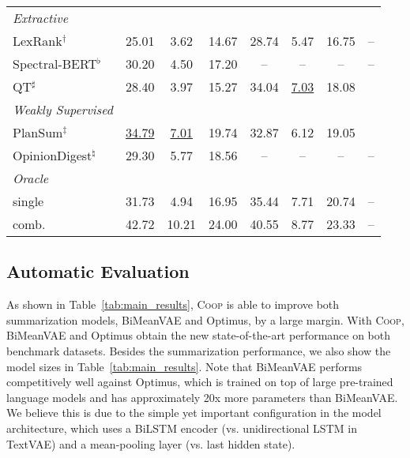 \documentclass[11pt]{article}
\newcommand{\aggname}{\textsc{Coop}}
\newcommand{\name}{\mbox{\sc BiMeanVAE}}
\begin{document}
\begin{table*}[t]
\begin{tabular}{lccccccc}
\textit{Extractive}\\
\quad LexRank$^\dagger$ & 25.01 & 3.62 & 14.67 & 28.74 & 5.47 & 16.75 & -- \\
\quad Spectral-BERT$^\flat$ & 30.20 & 4.50 & 17.20 & -- & -- & -- & --\\
\quad QT$^\sharp$ & 28.40 & 3.97 & 15.27 & 34.04 & \underline{7.03} & 18.08 \\
\midrule
\textit{Weakly Supervised}\\
\quad PlanSum$^\ddagger$ & \underline{34.79} & \underline{7.01} & 19.74 & 32.87 & 6.12 & 19.05\\
\quad OpinionDigest$^\natural$ & 29.30 & 5.77 & 18.56 & -- & -- & -- & -- \\
\midrule
\textit{Oracle}\\
\quad single & 31.73 & 4.94 & 16.95 & 35.44 & 7.71 & 20.74 & -- \\
\quad comb. & 42.72 & 10.21 & 24.00 & 40.55 & 8.77 & 23.33 & -- \\
\bottomrule
\end{tabular}
\caption{ROUGE scores on the benchmarks. Bold-faced and underlined denote the best and second-best scores respectively. \aggname{} significantly improves the performance of two summarization models, \name{} and Optimus, and achieves new state-of-the-art performance on both of the benchmark datasets.
$\dagger$ means the results
are copied from \citet{brazinskas-etal-2020-unsupervised}, $\ddagger$ from  \citet{amplayo2021unsupervised}, $\flat$ from 
\citet{wang-etal-2020-spectral}, $\sharp$ from \citet{angelidis2021extractive}, and $\natural$ from \citet{suhara-etal-2020-opiniondigest}. Note that this study classifies OpinionDigest and PlanSum as weakly-supervised summarizers since they use additional information other than review text.
}\label{tab:main_results}
\end{table*}

\subsection{Automatic Evaluation}
As shown in Table~\ref{tab:main_results}, \aggname{} is able to improve both summarization models, \name{} and Optimus, by a large margin. With \aggname{}, \name{} and Optimus obtain the new state-of-the-art performance on both benchmark datasets.
Besides the summarization performance, we also show the model sizes in Table~\ref{tab:main_results}. Note that \name{} performs competitively well against Optimus, which is trained on top of large pre-trained language models and has approximately 20x more parameters than \name. We believe this is due to the simple yet important configuration in the model architecture, which uses a BiLSTM encoder (vs. unidirectional LSTM in TextVAE) and a mean-pooling layer (vs. last hidden state).
\end{document}

